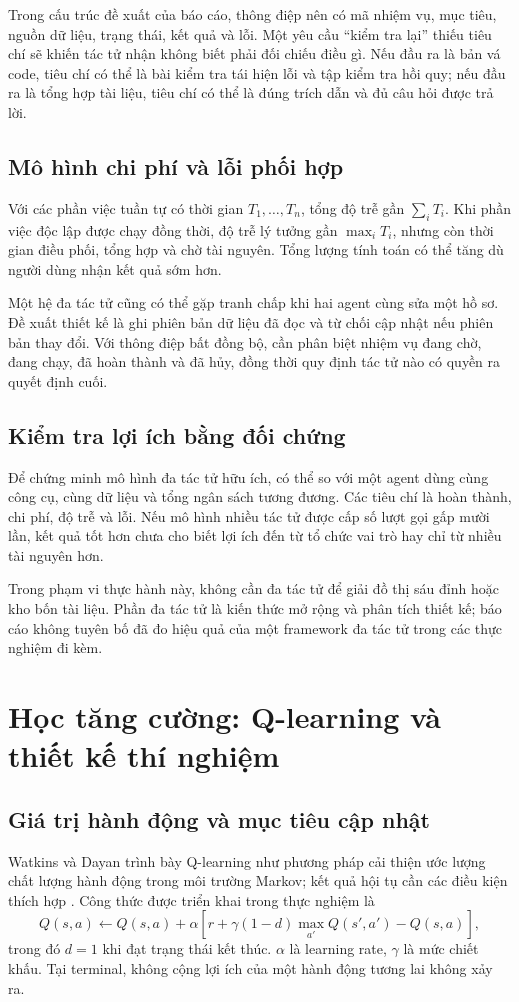 Trong cấu trúc đề xuất của báo cáo, thông điệp nên có mã nhiệm vụ, mục tiêu, nguồn dữ
liệu, trạng thái, kết quả và lỗi. Một yêu cầu ``kiểm tra lại'' thiếu tiêu chí sẽ khiến
tác tử nhận không biết phải đối chiếu điều gì. Nếu đầu ra là bản vá code, tiêu chí có
thể là bài kiểm tra tái hiện lỗi và tập kiểm tra hồi quy; nếu đầu ra là tổng hợp tài
liệu, tiêu chí có thể là đúng trích dẫn và đủ câu hỏi được trả lời.

\subsection{Mô hình chi phí và lỗi phối hợp}
Với các phần việc tuần tự có thời gian $T_1,\dots,T_n$, tổng độ trễ gần
$\sum_i T_i$. Khi phần việc độc lập được chạy đồng thời, độ trễ lý tưởng gần
$\max_i T_i$, nhưng còn thời gian điều phối, tổng hợp và chờ tài nguyên. Tổng lượng
tính toán có thể tăng dù người dùng nhận kết quả sớm hơn.

Một hệ đa tác tử cũng có thể gặp tranh chấp khi hai agent cùng sửa một hồ sơ. Đề xuất
thiết kế là ghi phiên bản dữ liệu đã đọc và từ chối cập nhật nếu phiên bản thay đổi.
Với thông điệp bất đồng bộ, cần phân biệt nhiệm vụ đang chờ, đang chạy, đã hoàn thành
và đã hủy, đồng thời quy định tác tử nào có quyền ra quyết định cuối.

\subsection{Kiểm tra lợi ích bằng đối chứng}
Để chứng minh mô hình đa tác tử hữu ích, có thể so với một agent dùng cùng công cụ,
cùng dữ liệu và tổng ngân sách tương đương. Các tiêu chí là hoàn thành, chi phí,
độ trễ và lỗi. Nếu mô hình nhiều tác tử được cấp số lượt gọi gấp mười lần, kết quả
tốt hơn chưa cho biết lợi ích đến từ tổ chức vai trò hay chỉ từ nhiều tài nguyên hơn.

Trong phạm vi thực hành này, không cần đa tác tử để giải đồ thị sáu đỉnh hoặc kho bốn
tài liệu. Phần đa tác tử là kiến thức mở rộng và phân tích thiết kế; báo cáo không
tuyên bố đã đo hiệu quả của một framework đa tác tử trong các thực nghiệm đi kèm.

\newpage
\section{Học tăng cường: Q-learning và thiết kế thí nghiệm}
\subsection{Giá trị hành động và mục tiêu cập nhật}
Watkins và Dayan trình bày Q-learning như phương pháp cải thiện ước lượng chất lượng
hành động trong môi trường Markov; kết quả hội tụ cần các điều kiện thích hợp
\cite{qlearning}. Công thức được triển khai trong thực nghiệm là
\[
Q(s,a)\leftarrow Q(s,a)+\alpha\left[r+\gamma(1-d)\max_{a'}Q(s',a')-Q(s,a)\right],
\]
trong đó $d=1$ khi đạt trạng thái kết thúc. $\alpha$ là learning rate, $\gamma$ là mức
chiết khấu. Tại terminal, không cộng lợi ích của một hành động tương lai không xảy ra.

